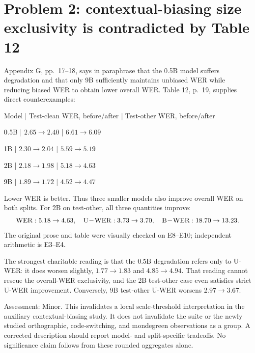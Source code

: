 \documentclass[10pt]{article}
\begin{document}
\section*{Problem 2: contextual-biasing size exclusivity is contradicted by Table 12}
Appendix G, pp. 17–18, says in paraphrase that the 0.5B model suffers degradation and that only 9B sufficiently maintains unbiased WER while reducing biased WER to obtain lower overall WER. Table 12, p. 19, supplies direct counterexamples:\par
Model | Test-clean WER, before/after | Test-other WER, before/after\par
0.5B | \(2.65\to2.40\) | \(6.61\to6.09\)\par
1B | \(2.30\to2.04\) | \(5.59\to5.19\)\par
2B | \(2.18\to1.98\) | \(5.18\to4.63\)\par
9B | \(1.89\to1.72\) | \(4.52\to4.47\)\par
Lower WER is better. Thus three smaller models also improve overall WER on both splits. For 2B on test-other, all three quantities improve: \[{\rm WER}:5.18\to4.63,\quad
 {\rm U\!-\!WER}:3.73\to3.70,\quad
 {\rm B\!-\!WER}:18.70\to13.23.\] The original prose and table were visually checked on E8–E10; independent arithmetic is E3–E4.\par
The strongest charitable reading is that the 0.5B degradation refers only to U-WER: it does worsen slightly, \(1.77\to1.83\) and \(4.85\to4.94\). That reading cannot rescue the overall-WER exclusivity, and the 2B test-other case even satisfies strict U-WER improvement. Conversely, 9B test-other U-WER worsens \(2.97\to3.67\).\par
Assessment: Minor. This invalidates a local scale-threshold interpretation in the auxiliary contextual-biasing study. It does not invalidate the suite or the newly studied orthographic, code-switching, and mondegreen observations as a group. A corrected description should report model- and split-specific tradeoffs. No significance claim follows from these rounded aggregates alone.\par
\end{document}

